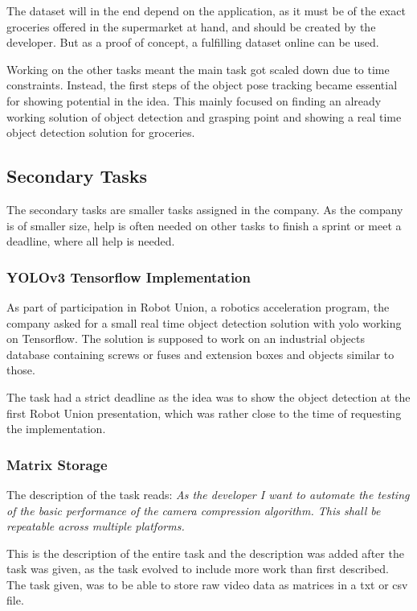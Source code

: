 The dataset will in the end depend on the application, as it must be of the exact groceries offered in the supermarket at hand, and should be created by the developer. But as a proof of concept, a fulfilling dataset online can be used.

Working on the other tasks meant the main task got scaled down due to time constraints. Instead, the first steps of the object pose tracking became essential for showing potential in the idea. This mainly focused on finding an already working solution of object detection and grasping point and showing a real time object detection solution for groceries.

\subsection{Secondary Tasks}
The secondary tasks are smaller tasks assigned in the company. As the company is of smaller size, help is often needed on other tasks to finish a sprint or meet a deadline, where all help is needed.

\subsubsection{YOLOv3 Tensorflow Implementation}
As part of participation in Robot Union, a robotics acceleration program, the company asked for a small real time object detection solution with \gls{yolo} working on Tensorflow. The solution is supposed to work on an industrial objects database containing screws or fuses and extension boxes and objects similar to those.

The task had a strict deadline as the idea was to show the object detection at the first Robot Union presentation, which was rather close to the time of requesting the implementation.

\subsubsection{Matrix Storage}
The description of the task reads: \textit{As the developer I want to automate the testing of the basic performance of the camera compression algorithm. This shall be repeatable across multiple platforms.}

This is the description of the entire task and the description was added after the task was given, as the task evolved to include more work than first described. The task given, was to be able to store raw video data as matrices in a txt or csv file.

